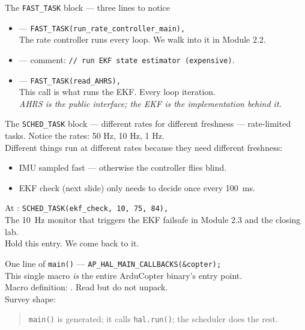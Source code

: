\documentclass[aspectratio=169,11pt]{beamer}
\begin{document}
\begin{frame}{The \texttt{FAST\_TASK} block --- three lines to notice}
  \begin{itemize}
    \item {} --- \texttt{FAST\_TASK(run\_rate\_controller\_main),}\\
      The rate controller runs every loop. We walk into it in Module 2.2.
    \item {} --- comment: \texttt{// run EKF state estimator (expensive)}.
    \item {} --- \texttt{FAST\_TASK(read\_AHRS),}\\
      This call is what runs the EKF. Every loop iteration.\\
      \emph{AHRS is the public interface; the EKF is the implementation behind it.}
  \end{itemize}
\end{frame}

\begin{frame}{The \texttt{SCHED\_TASK} block --- different rates for different freshness}
   --- rate-limited tasks. Notice the rates: 50 Hz, 10 Hz, 1 Hz.\\[1ex]
  Different things run at different rates because they need different freshness:
  \begin{itemize}
    \item IMU sampled fast --- otherwise the controller flies blind.
    \item EKF check (next slide) only needs to decide once every 100~ms.
  \end{itemize}
  \vfill
  At : \texttt{SCHED\_TASK(ekf\_check, 10, 75, 84),}\\
  The 10~Hz monitor that triggers the EKF failsafe in Module 2.3 and the closing lab.\\[1ex]
  Hold this entry. We come back to it.
\end{frame}

\begin{frame}{One line of \texttt{main()}}
   --- \texttt{AP\_HAL\_MAIN\_CALLBACKS(\&copter);}\\[1ex]
  This single macro \emph{is} the entire ArduCopter binary's entry point.\\[1ex]
  Macro definition: . Read but do not unpack.\\[1ex]
  Survey shape:
  \begin{quote}
    \texttt{main()} is generated; it calls \texttt{hal.run()}; the scheduler does the rest.
  \end{quote}
\end{frame}
\end{document}
